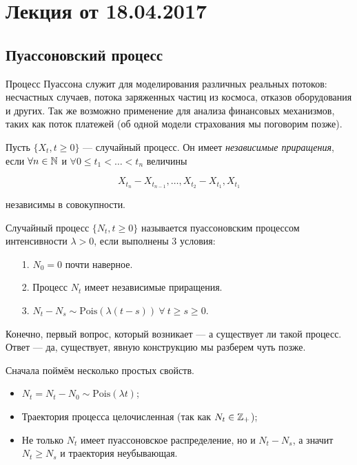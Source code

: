 \section{Лекция от 18.04.2017}

\subsection{Пуассоновский процесс}

Процесс Пуассона служит для моделирования различных реальных потоков: 
несчастных случаев, потока заряженных частиц из космоса, отказов 
оборудования и других. Так же возможно применение для анализа финансовых 
механизмов, таких как поток платежей (об одной модели страхования мы 
поговорим позже).

\begin{definition}
  Пусть $\{X_t, t \geq 0\}$ --- случайный процесс. Он имеет 
  \textit{независимые приращения}, если $\forall n \in \mathbb{N}$ и
  $\forall 0 \leq t_1 < \ldots < t_n$ величины

  \[
    X_{t_n} - X_{t_{n - 1}}, \ldots, X_{t_2} - X_{t_1}, X_{t_1}
  \]

  независимы в совокупности.
\end{definition}

\begin{definition}
  Случайный процесс $\{N_t, t \geq 0\}$ называется
  пуассоновским процессом интенсивности $\lambda > 0$,
  если выполнены 3 условия:

  \begin{itemize}
    \item[1.] $N_0 = 0$ почти наверное.
    \item[2.] Процесс $N_t$ имеет независимые приращения.
    \item[3.] $N_t - N_s \sim \mathrm{Pois}(\lambda(t - s)) \ 
    \forall \ t \geq s \geq 0$. 
  \end{itemize}
\end{definition}

Конечно, первый вопрос, который возникает --- а существует ли такой 
процесс. Ответ --- да, существует, явную конструкцию мы разберем чуть
позже.

Сначала поймём несколько простых свойств. 

\begin{itemize}
  \item $N_t = N_t - N_0 \sim \mathrm{Pois}(\lambda t)$;
  \item Траектория процесса целочисленная (так как $N_t \in \mathbb{Z}_+$);
  \item Не только $N_t$ имеет пуассоновское распределение, но и
  $N_t - N_s$, а значит $N_t \geq N_s$ и траектория неубывающая.
\end{itemize}

